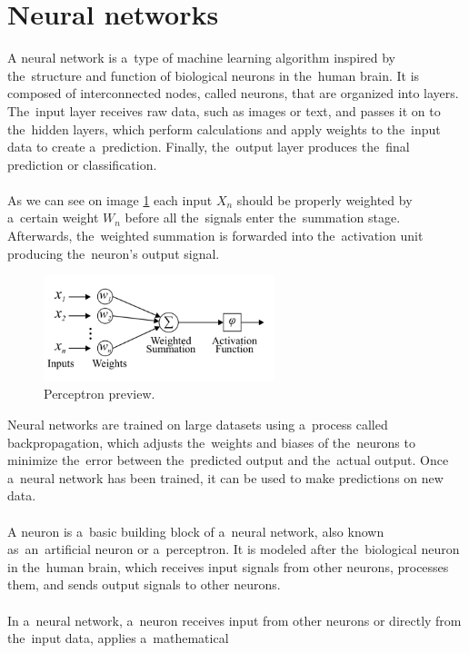 \section{Neural networks} \label{sec:nn}
A neural network is a~type of machine learning algorithm inspired by the~structure and function of biological neurons
in the~human brain. It is composed of interconnected nodes, called neurons, that are organized into layers. The~input
layer receives raw data, such as images or text, and passes it on to the~hidden layers, which perform calculations and
apply weights to the~input data to create a~prediction. Finally, the~output layer produces the~final prediction
or classification.\\
\\
As we can see on image \ref{fig:perceptron} each input $X_n$ should be properly weighted by a~certain weight $W_n$ before
all the~signals enter the~summation stage. Afterwards, the~weighted summation is forwarded into the~activation unit
producing the~neuron’s output signal.
\begin{center}
    \begin{figure}[!ht]
        \centering
        \includegraphics[width=0.6\textwidth]{figures/nn}
        \caption{Perceptron preview. \cite{Mourgias-Alexandris:19}}
        \label{fig:perceptron}
    \end{figure}
\end{center}
Neural networks are trained on large datasets using a~process called backpropagation, which adjusts the~weights and
biases of the~neurons to minimize the~error between the~predicted output and the~actual output. Once a~neural network
has been trained, it can be used to make predictions on new data.\\
\\
A neuron is a~basic building block of a~neural network, also known as~an~artificial neuron or a~perceptron.
It is modeled after the~biological neuron in the~human brain, which receives input signals from other neurons,
processes them, and sends output signals to other neurons.\\
\\
In a~neural network, a~neuron receives input from other neurons or directly from the~input data, applies a~mathematical
